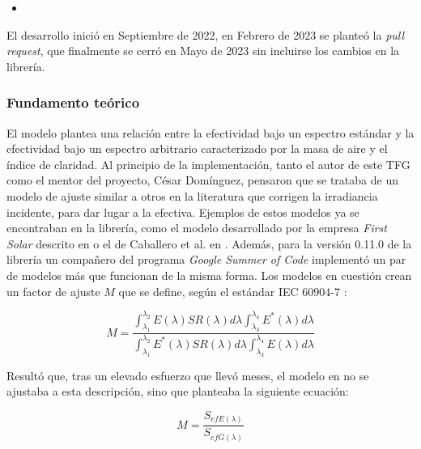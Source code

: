 \begin{itemize}
    \item {}
\end{itemize}

El desarrollo inició en Septiembre de 2022, en Febrero de 2023 se planteó la \textit{pull request}, que finalmente se cerró en Mayo de 2023 sin incluirse los cambios en la librería.

\subsubsection{Fundamento teórico}

El modelo \cite{Martín_Ruiz_1999} plantea una relación entre la efectividad bajo un espectro estándar y la efectividad bajo un espectro arbitrario caracterizado por la masa de aire y el índice de claridad. Al principio de la implementación, tanto el autor de este TFG como el mentor del proyecto, César Domínguez, pensaron que se trataba de un modelo de ajuste similar a otros en la literatura que corrigen la irradiancia incidente, para dar lugar a la efectiva. Ejemplos de estos modelos ya se encontraban en la librería, como el modelo desarrollado por la empresa \textit{First Solar} descrito en \cite{Lee_Panchula_2016} o el de Caballero et al. en \cite{Caballero_Fernández_Theristis_Almonacid_Nofuentes_2018}. Además, para la versión 0.11.0 de la librería un compañero del programa \textit{Google Summer of Code} implementó un par de modelos más que funcionan de la misma forma. Los modelos en cuestión crean un factor de ajuste $M$ que se define, según el estándar IEC 60904-7 \cite[Eq. (2)]{Caballero_Fernández_Theristis_Almonacid_Nofuentes_2018}:

\begin{equation}
    M = \frac
    {\int_{\lambda_1}^{\lambda_2} E(\lambda) SR(\lambda) d\lambda \int_{\lambda_3}^{\lambda_4} E^*(\lambda) d\lambda}
    {\int_{\lambda_1}^{\lambda_2} E^*(\lambda) SR(\lambda) d\lambda \int_{\lambda_3}^{\lambda_4} E(\lambda) d\lambda}
\end{equation}

Resultó que, tras un elevado esfuerzo que llevó meses, el modelo en \cite{Martín_Ruiz_1999} no se ajustaba a esta descripción, sino que planteaba la siguiente ecuación:

\begin{equation} \label{eq:ajuste_articulo_Nuria}
    M = \frac{S_{efE(\lambda)}}{S_{ef\bar{G}(\lambda)}}
\end{equation}

